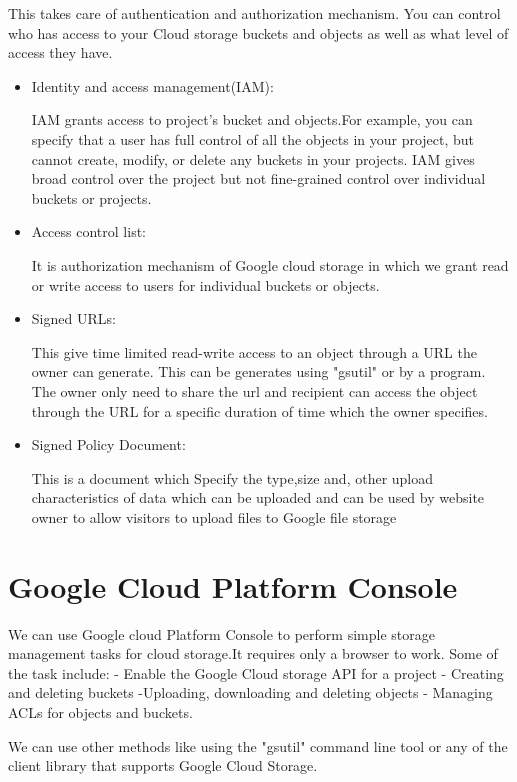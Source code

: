 \documentclass[9pt,twocolumn,twoside]{styles/osajnl}
\begin{document}
This takes care of authentication and authorization mechanism. You can control who has access to your Cloud storage buckets and objects as well as what level of access they have. 

\begin{itemize}


\item Identity and access management(IAM):

IAM grants access to project's bucket and objects.For example, you can specify that a user has full control of all the objects in your project, but cannot create, modify, or delete any buckets in your projects. IAM gives broad control over the project but not fine-grained control over individual buckets or projects.

\item Access control list:

 It is authorization mechanism of Google cloud storage in which we grant read or write access to users for individual buckets or objects.


\item Signed URLs:
 
This give time limited read-write access to an object through a URL the owner can generate. This can be generates using "gsutil" or by a program. The owner only need to share the url and recipient can access the object through the URL for a specific duration of time which the owner specifies.


\item Signed Policy Document:

This is a document which Specify the type,size and, other upload characteristics of data which can be uploaded and can be used by website owner to allow visitors to upload files to Google file storage

\end{itemize}

\section{Google Cloud Platform Console }

We can use Google cloud Platform Console to perform simple storage management tasks for cloud storage.It requires only a browser to work. Some of the task include:
- Enable the Google Cloud storage API for a project
- Creating and deleting buckets 
-Uploading, downloading and deleting objects
- Managing ACLs for objects and buckets.


We can use other methods like using the "gsutil" command line tool or any of the client library that supports Google Cloud Storage.
\end{document}
